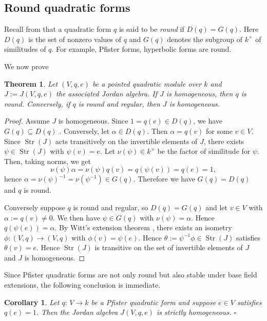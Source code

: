 \documentclass{amsart}
\newtheorem{thm}[equation]{Theorem}
\newtheorem{cor}[equation]{Corollary}
\theoremstyle{definition} %
\theoremstyle{remark} %
\DeclareMathOperator{\Str}{Str}
\renewcommand{\:}{\colon\,}
\numberwithin{equation}{section}
\begin{document}
\subsection{Round quadratic forms} \label{ss.RDQUAF} Recall from \cite[p.~52]{MR2427530} that a quadratic form $q$ is said to be \emph{round} if $D(q)=G(q)$. Here 
$D(q)$ is the set of nonzero values of $q$ and $G(q)$ denotes the subgroup of $k^\times$ of similitudes of $q$. For example, Pfister forms, hyperbolic forms are round. 

We now prove

\begin{thm}\label{quad-homog} Let $(V,q,e)$ be a pointed quadratic module over $k$ and $J := J(V,q,e)$ the associated Jordan algebra. If $J$ is homogeneous, then $q$ is round. Conversely, if $q$ is round and regular, then $J$ is homogeneous.
\end{thm}

\begin{proof} Assume $J$ is homogeneous. Since $1 = q(e) \in D(q)$, we have  $G(q) \subseteq D(q)$ \cite[Lemma~9.1]{MR2427530}. Conversely, let $\alpha\in D(q)$. Then $\alpha=q(v)$ for some $v\in V$. Since $\Str(J)$ acts transitively on the invertible elements of $J$, there exists $\psi\in \Str(J)$ with $\psi(v)=e$. Let $\nu(\psi)\in k^{\times}$ be the factor of similitude for $\psi$. Then, taking norms, we get 
$$\nu(\psi)\alpha = \nu(\psi)q(v) = q(\psi(v)) = q(e) = 1, $$
hence $\alpha = \nu(\psi)^{-1} = \nu(\psi^{-1}) \in G(q)$.
Therefore we have $G(q)=D(q)$ and $q$ is round. 

Conversely suppose $q$ is round and regular, so $D(q)=G(q)$ and let $v\in V$ with $\alpha := q(v)\neq 0$. We then have $\psi\in G(q)$ with 
$\nu(\psi)=\alpha$. Hence $q(\psi(e))=\alpha$. By Witt's extension theorem \cite[Thm.~8.3]{MR2427530}, there exists an isometry $\phi:(V,q)\rightarrow (V,q)$ with $\phi(v) = \psi(e)$. Hence $\theta:= \psi^{-1}\phi\in \Str(J)$ satisfies $\theta(v) = e$. Hence $\Str(J)$ is transitive on the set of invertible elements of $J$ and $J$ is homogeneous. 
\end{proof}

Since Pfister quadratic forms are not only round but also stable under base field extensions, the following conclusion is immediate.

\begin{cor} \label{PFIHOM}
Let $q\:V \to k$ be a Pfister quadratic form and suppose $e \in V$ satisfies $q(e) = 1$. Then the Jordan algebra $J(V,q,e)$ is strictly homogeneous. \hfill $\square$    
\end{cor}
\end{document}

